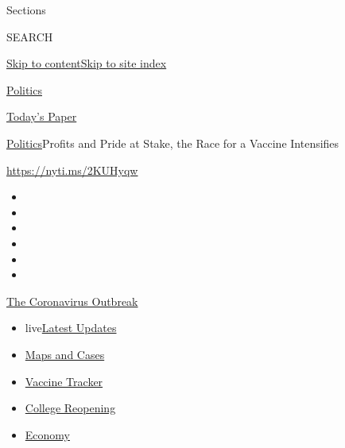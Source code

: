 Sections

SEARCH

\protect\hyperlink{site-content}{Skip to
content}\protect\hyperlink{site-index}{Skip to site index}

\href{https://www.nytimes3xbfgragh.onion/section/politics}{Politics}

\href{https://myaccount.nytimes3xbfgragh.onion/auth/login?response_type=cookie\&client_id=vi}{}

\href{https://www.nytimes3xbfgragh.onion/section/todayspaper}{Today's
Paper}

\href{/section/politics}{Politics}\textbar{}Profits and Pride at Stake,
the Race for a Vaccine Intensifies

\url{https://nyti.ms/2KUHyqw}

\begin{itemize}
\item
\item
\item
\item
\item
\item
\end{itemize}

\href{https://www.nytimes3xbfgragh.onion/news-event/coronavirus?action=click\&pgtype=Article\&state=default\&region=TOP_BANNER\&context=storylines_menu}{The
Coronavirus Outbreak}

\begin{itemize}
\tightlist
\item
  live\href{https://www.nytimes3xbfgragh.onion/2020/08/04/world/coronavirus-cases.html?action=click\&pgtype=Article\&state=default\&region=TOP_BANNER\&context=storylines_menu}{Latest
  Updates}
\item
  \href{https://www.nytimes3xbfgragh.onion/interactive/2020/us/coronavirus-us-cases.html?action=click\&pgtype=Article\&state=default\&region=TOP_BANNER\&context=storylines_menu}{Maps
  and Cases}
\item
  \href{https://www.nytimes3xbfgragh.onion/interactive/2020/science/coronavirus-vaccine-tracker.html?action=click\&pgtype=Article\&state=default\&region=TOP_BANNER\&context=storylines_menu}{Vaccine
  Tracker}
\item
  \href{https://www.nytimes3xbfgragh.onion/2020/08/02/us/covid-college-reopening.html?action=click\&pgtype=Article\&state=default\&region=TOP_BANNER\&context=storylines_menu}{College
  Reopening}
\item
  \href{https://www.nytimes3xbfgragh.onion/live/2020/08/04/business/stock-market-today-coronavirus?action=click\&pgtype=Article\&state=default\&region=TOP_BANNER\&context=storylines_menu}{Economy}
\end{itemize}

